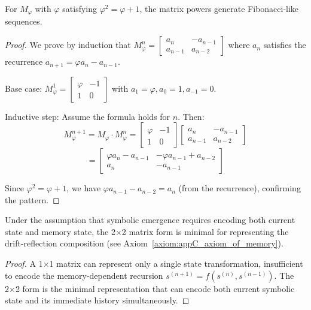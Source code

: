 \begin{lemma}
\label{lem:appC_fibonacci_structure_matrix_powers}
For $M_\varphi$ with $\varphi$ satisfying $\varphi^2 = \varphi + 1$, the matrix powers generate Fibonacci-like sequences.
\end{lemma}

\begin{proof}
We prove by induction that $M_\varphi^n = \begin{bmatrix} a_n & -a_{n-1} \\ a_{n-1} & a_{n-2} \end{bmatrix}$ where $a_n$ satisfies the recurrence $a_{n+1} = \varphi a_n - a_{n-1}$.

Base case: $M_\varphi^1 = \begin{bmatrix} \varphi & -1 \\ 1 & 0 \end{bmatrix}$ with $a_1 = \varphi, a_0 = 1, a_{-1} = 0$.

Inductive step: Assume the formula holds for $n$. Then:
\[
M_\varphi^{n+1} = M_\varphi \cdot M_\varphi^n = \begin{bmatrix} \varphi & -1 \\ 1 & 0 \end{bmatrix} \begin{bmatrix} a_n & -a_{n-1} \\ a_{n-1} & a_{n-2} \end{bmatrix}
\]
\[
= \begin{bmatrix} \varphi a_n - a_{n-1} & -\varphi a_{n-1} + a_{n-2} \\ a_n & -a_{n-1} \end{bmatrix}
\]

Since $\varphi^2 = \varphi + 1$, we have $\varphi a_{n-1} - a_{n-2} = a_n$ (from the recurrence), confirming the pattern.
\end{proof}

\begin{proposition}
\label{prop:appC_conditional_minimality_2x2}
Under the assumption that symbolic emergence requires encoding both current state and memory state, the 2×2 matrix form is minimal for representing the drift-reflection composition (see Axiom~\ref{axiom:appC_axiom_of_memory}).
\end{proposition}

\begin{proof}
A 1×1 matrix can represent only a single state transformation, insufficient to encode the memory-dependent recursion $s^{(n+1)} = f(s^{(n)}, s^{(n-1)})$. The 2×2 form is the minimal representation that can encode both current symbolic state and its immediate history simultaneously.
\end{proof}

